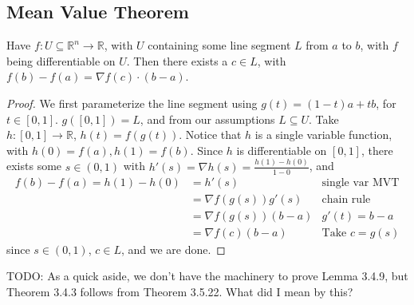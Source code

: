 \subsection{Mean Value Theorem}

\begin{simplethm}[MVT] \label{thm:mvt}
    Have $f : U \subseteq \mathbb{R}^n \to \mathbb{R}$, with $U$ containing some line segment $L$ from $a$ to $b$, with $f$ being differentiable on $U$. Then there exists a $c \in L$, with $f(b) - f(a) = \nabla f(c) \cdot (b-a)$.
\end{simplethm}

\begin{proof}
    We first parameterize the line segment using $g(t) = (1-t)a + tb$, for $t \in [0, 1]$. $g([0, 1]) = L$, and from our assumptions $L \subseteq U$. Take $h : [0, 1] \to \mathbb{R}$, $h(t) = f(g(t))$. Notice that $h$ is a single variable function, with $h(0) = f(a), h(1) = f(b)$. Since $h$ is differentiable on $[0, 1]$, there exists some $s \in (0, 1)$ with $h'(s) = \nabla h(s) = \frac{h(1)-h(0)}{1-0}$, and
    \begin{align*}
        f(b) - f(a) = h(1) - h(0) &= h'(s) & \text{single var MVT} \\
        &= \nabla f(g(s)) g'(s) & \text{chain rule}\\
        &= \nabla f(g(s)) (b - a) & g'(t) = b - a\\
        &= \nabla f(c) (b - a) & \text{Take $c = g(s)$}
    \end{align*}
    since $s \in (0, 1)$, $c \in L$, and we are done.
\end{proof}

TODO: As a quick aside, we don't have the machinery to prove Lemma 3.4.9, but Theorem 3.4.3 follows from Theorem 3.5.22. What did I mean by this?
